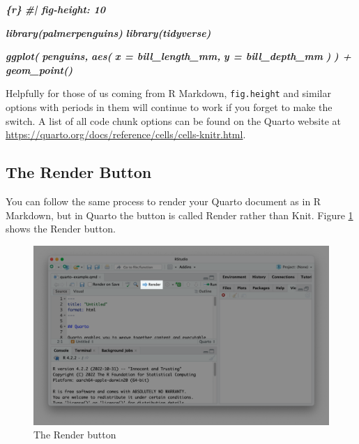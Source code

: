 \documentclass[
]{book}
\newenvironment{Shaded}{\begin{snugshade}}{\end{snugshade}}
\newcommand{\InformationTok}[1]{\textcolor[rgb]{0.56,0.35,0.01}{\textbf{\textit{#1}}}}
\begin{document}
\begin{Shaded}
\begin{Highlighting}[]
\InformationTok{\textasciigrave{}\textasciigrave{}\textasciigrave{}\{r\}}
\InformationTok{\#| fig{-}height: 10}

\InformationTok{library(palmerpenguins)}
\InformationTok{library(tidyverse)}

\InformationTok{ggplot(}
\InformationTok{  penguins,}
\InformationTok{  aes(}
\InformationTok{    x = bill\_length\_mm,}
\InformationTok{    y = bill\_depth\_mm}
\InformationTok{  )}
\InformationTok{) +}
\InformationTok{  geom\_point()}
\InformationTok{\textasciigrave{}\textasciigrave{}\textasciigrave{}}
\end{Highlighting}
\end{Shaded}

Helpfully for those of us coming from R Markdown, \texttt{fig.height} and similar options with periods in them will continue to work if you forget to make the switch. A list of all code chunk options can be found on the Quarto website at \url{https://quarto.org/docs/reference/cells/cells-knitr.html}.

\hypertarget{the-render-button}{%
\subsection*{The Render Button}\label{the-render-button}}

You can follow the same process to render your Quarto document as in R Markdown, but in Quarto the button is called Render rather than Knit. Figure \ref{fig:render-button} shows the Render button.

\begin{figure}
\includegraphics[width=1\linewidth]{assets/render-button} \caption{The Render button}\label{fig:render-button}
\end{figure}
\end{document}
